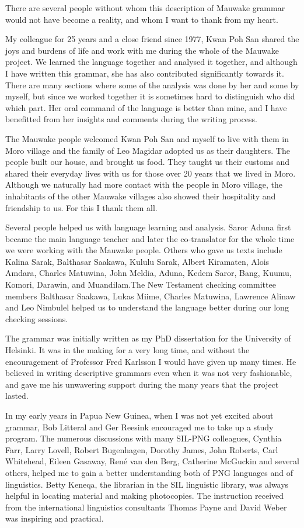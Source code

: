 
There are several people without whom this description of Mauwake grammar would not have become a reality, and whom I want to thank from my heart.

My colleague for 25 years and a close friend since 1977, Kwan Poh San shared the joys and burdens of life and work with me during the whole of the Mauwake project. We learned the language together and analysed it together, and although I have written this grammar, she has also contributed significantly towards it.  There are many sections where some of the analysis was done by her and some by myself, but since we worked together it is sometimes hard to distinguish who did which part. Her oral command of the language is better than mine, and I have benefitted from her insights and comments during the writing process.  

The Mauwake people welcomed Kwan Poh San and myself to live with them in Moro village and the family of Leo Magidar adopted us as their daughters. The people built our house, and brought us food. They taught us their customs and shared their everyday lives with us for those over 20 years that we lived in Moro. Although we naturally had more contact with the people in Moro village, the inhabitants of the other Mauwake villages also showed their hospitality and friendship to us. For this I thank them all. 

Several people helped us with language learning and analysis. Saror Aduna first became the main language teacher and later the co-translator for the whole time we were working with the Mauwake people. Others who gave us texts include Kalina Sarak, Balthasar Saakawa, Kululu Sarak, Albert Kiramaten, Alois Amdara, Charles Matuwina, John Meldia, Aduna, Kedem Saror, Bang, Kuumu, Komori, Darawin, and Muandilam.The New Testament checking committee members Balthasar Saakawa, Lukas Miime, Charles Matuwina, Lawrence Alinaw and Leo Nimbulel helped us to understand the language better during our long checking sessions.

The grammar was initially written as my PhD dissertation for the University of Helsinki. It was in the making for a very long time, and without the encouragement of Professor Fred Karlsson I would have given up many times. He believed in writing descriptive grammars even when it was not very fashionable, and gave me his unwavering support during the many years that the project lasted.

In my early years in Papua New Guinea, when I was not yet excited about grammar,  Bob Litteral and Ger Reesink encouraged me to take up a study program. The numerous discussions with many SIL-PNG colleagues, Cynthia Farr, Larry Lovell, Robert Bugenhagen, Dorothy James, John Roberts, Carl Whitehead, Eileen Gasaway, Ren\'e van den Berg, Catherine McGuckin and several others, helped me to gain a better understanding both of  PNG languages and of linguistics. Betty Keneqa, the librarian in the SIL linguistic library, was always helpful in locating material and making photocopies. The instruction received from the international linguistics consultants Thomas Payne and David Weber was inspiring and practical.

